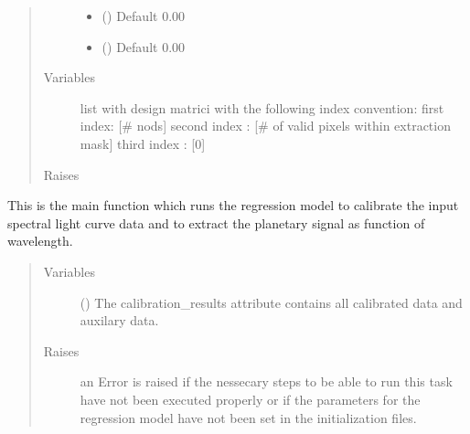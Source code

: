 \documentclass[a4paper,10pt,english]{sphinxmanual}
\begin{document}
\begin{fulllineitems}
\begin{fulllineitems}
\begin{quote}
\begin{description}
\begin{itemize}
\item {} 
 () \textendash{} Default 0.00

\item {} 
 () \textendash{} Default 0.00

\end{itemize}

\item[{Variables}] \leavevmode
{} \textendash{} list with design matrici with the following index convention:
first index: {[}\# nods{]}
second index : {[}\# of valid pixels within extraction mask{]}
third index : {[}0{]}

\item[{Raises}] \leavevmode
{}

\end{description}\end{quote}

\end{fulllineitems}


\begin{fulllineitems}
\label{\detokenize{cascade.TSO:cascade.TSO.TSO.TSOSuite.calibrate_timeseries}}
This is the main function which runs the regression model to
calibrate the input spectral light curve data and to extract the
planetary signal as function of wavelength.
\begin{quote}\begin{description}
\item[{Variables}] \leavevmode
{} () \textendash{} The calibration\_results attribute contains all calibrated data
and auxilary data.

\item[{Raises}] \leavevmode
{} \textendash{} an Error is raised if the nessecary steps to be able to run this
task have not been executed properly or if the parameters for
the regression model have not been set in the initialization files.


\end{description}
\end{quote}
\end{fulllineitems}
\end{fulllineitems}
\end{document}
